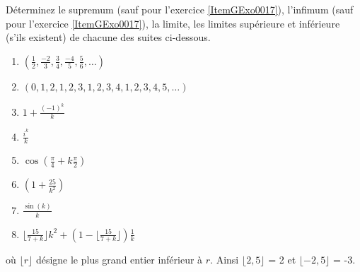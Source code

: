 
\begin{exercice}\label{exo0017}

Déterminez le supremum (sauf pour l'exercice \ref{ItemGExo0017}), l'infimum (sauf pour l'exercice \ref{ItemGExo0017}), la limite, les limites supérieure et inférieure (s'ils existent) de chacune des suites ci-dessous.
\begin{enumerate}
	\item $(\frac{1}{2}, \frac{-2}{3}, \frac{3}{4}, \frac{-4}{5}, \frac{5}{6}, \ldots) $
	\item $(0,1,2,1,2,3,1,2,3,4,1,2,3,4,5, \ldots) $
	\item $1 + \frac{(-1)^k}{k} $
	\item $\frac{i^k}{k}$
	\item $\cos(\frac{\pi}{4} + k \frac{\pi}{2})$
	\item $(1 + \frac{25}{k^2})$
	\item\label{ItemGExo0017} $\frac{\sin(k)}{k}$
	\item $ \lfloor \frac{15}{7+k} \rfloor k^2 + (1 - \lfloor \frac{15}{ 7+k} \rfloor ) \frac{1}{k}$
\end{enumerate}
où $\lfloor r \rfloor$ désigne le plus grand entier inférieur à $r$. Ainsi $\lfloor 2,5 \rfloor$ = 2 et $\lfloor -2,5 \rfloor$ = -3.

\end{exercice}
